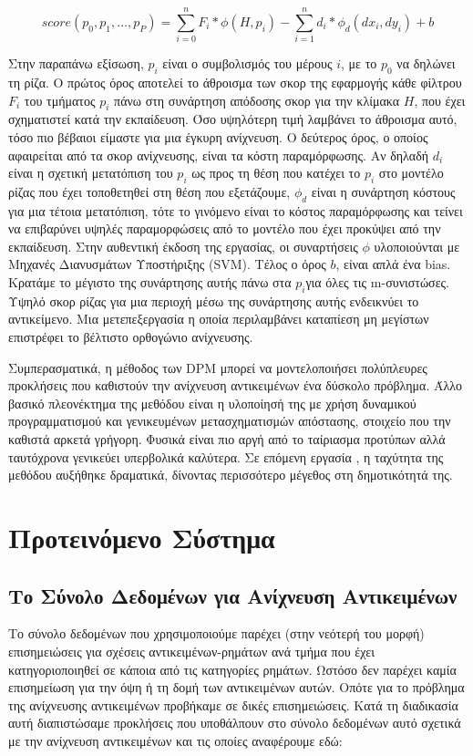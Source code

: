\documentclass[11pt,a4paper,english,greek,twoside]{../Thesis}
\begin{document}
\begin{equation}\label{eq:DPM}
    score(p_0,p_1, \dots ,p_P)=\sum_{i=0}^{n} F_i*\phi(H,p_i)-\sum_{i=1}^{n} d_i*\phi_d(dx_i,dy_i)+b
\end{equation}

Στην παραπάνω εξίσωση, $p_i$ είναι ο συμβολισμός του μέρους $i$, με το $p_0$ να δηλώνει τη ρίζα. Ο πρώτος όρος αποτελεί το άθροισμα των σκορ της εφαρμογής κάθε φίλτρου $F_i$ του τμήματος $p_i$ πάνω στη συνάρτηση απόδοσης σκορ για την κλίμακα $H$, που έχει σχηματιστεί κατά την εκπαίδευση. Όσο υψηλότερη τιμή λαμβάνει το άθροισμα αυτό, τόσο πιο βέβαιοι είμαστε για μια έγκυρη ανίχνευση. Ο δεύτερος όρος, ο οποίος αφαιρείται από τα σκορ ανίχνευσης, είναι τα κόστη παραμόρφωσης. Αν δηλαδή $d_i$ είναι η σχετική μετατόπιση του $p_i$ ως προς τη θέση που κατέχει το $p_i$ στο μοντέλο ρίζας που έχει τοποθετηθεί στη θέση που εξετάζουμε, $\phi_d$ είναι η συνάρτηση κόστους για μια τέτοια μετατόπιση, τότε το γινόμενο είναι το κόστος παραμόρφωσης και τείνει να επιβαρύνει υψηλές παραμορφώσεις από το μοντέλο που έχει προκύψει από την εκπαίδευση. Στην αυθεντική έκδοση της εργασίας, οι συναρτήσεις $\phi$ υλοποιούνται με Μηχανές Διανυσμάτων Υποστήριξης (SVM). Τέλος ο όρος $b$, είναι απλά ένα bias. Κρατάμε το μέγιστο της συνάρτησης αυτής πάνω στα $p_i $για όλες τις m-συνιστώσες. Υψηλό σκορ ρίζας για μια περιοχή μέσω της συνάρτησης αυτής ενδεικνύει το αντικείμενο. Μια μετεπεξεργασία η οποία περιλαμβάνει καταπίεση μη μεγίστων επιστρέφει το βέλτιστο ορθογώνιο ανίχνευσης.

\par Συμπερασματικά, η μέθοδος των DPM μπορεί να μοντελοποιήσει πολύπλευρες προκλήσεις που καθιστούν την ανίχνευση αντικειμένων ένα δύσκολο πρόβλημα. Άλλο βασικό πλεονέκτημα της μεθόδου είναι η υλοποίησή της με χρήση δυναμικού προγραμματισμού και γενικευμένων μετασχηματισμών απόστασης, στοιχείο που την καθιστά αρκετά γρήγορη. Φυσικά είναι πιο αργή από το ταίριασμα προτύπων αλλά ταυτόχρονα γενικεύει υπερβολικά καλύτερα. Σε επόμενη εργασία \cite{felzenszwalb_2010_cascade}, η ταχύτητα της μεθόδου αυξήθηκε δραματικά, δίνοντας περισσότερο μέγεθος στη δημοτικότητά της.


\section{Προτεινόμενο Σύστημα}
\subsection{Το Σύνολο Δεδομένων για Ανίχνευση Αντικειμένων}
Το σύνολο δεδομένων που χρησιμοποιούμε παρέχει (στην νεότερή του μορφή) επισημειώσεις για σχέσεις αντικειμένων-ρημάτων ανά τμήμα που έχει κατηγοριοποιηθεί σε κάποια από τις κατηγορίες ρημάτων. Ωστόσο δεν παρέχει καμία επισημείωση για την όψη ή τη δομή των αντικειμένων αυτών. Οπότε για το πρόβλημα της ανίχνευσης αντικειμένων προβήκαμε σε δικές επισημειώσεις. Κατά τη διαδικασία αυτή διαπιστώσαμε προκλήσεις που υποθάλπουν στο σύνολο δεδομένων αυτό σχετικά με την ανίχνευση αντικειμένων και τις οποίες αναφέρουμε εδώ:
\end{document}
